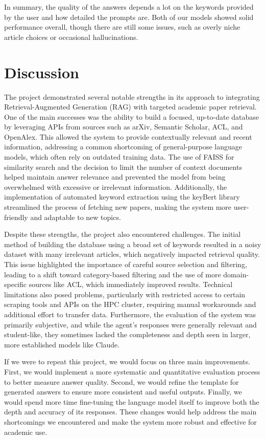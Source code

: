\documentclass[fleqn,moreauthors,10pt]{ds_report}
\begin{document}
In summary, the quality of the answers depends a lot on the keywords provided by the user and how detailed the prompts are. Both of our models showed solid performance overall, though there are still some issues, such as overly niche article choices or occasional hallucinations. 



\section*{Discussion}

The project demonstrated several notable strengths in its approach to integrating Retrieval-Augmented Generation (RAG) with targeted academic paper retrieval. One of the main successes was the ability to build a focused, up-to-date database by leveraging APIs from sources such as arXiv, Semantic Scholar, ACL, and OpenAlex. This allowed the system to provide contextually relevant and recent information, addressing a common shortcoming of general-purpose language models, which often rely on outdated training data. The use of FAISS for similarity search and the decision to limit the number of context documents helped maintain answer relevance and prevented the model from being overwhelmed with excessive or irrelevant information. Additionally, the implementation of automated keyword extraction using the keyBert library streamlined the process of fetching new papers, making the system more user-friendly and adaptable to new topics.

Despite these strengths, the project also encountered challenges. The initial method of building the database using a broad set of keywords resulted in a noisy dataset with many irrelevant articles, which negatively impacted retrieval quality. This issue highlighted the importance of careful source selection and filtering, leading to a shift toward category-based filtering and the use of more domain-specific sources like ACL, which immediately improved results. Technical limitations also posed problems, particularly with restricted access to certain scraping tools and APIs on the HPC cluster, requiring manual workarounds and additional effort to transfer data. Furthermore, the evaluation of the system was primarily subjective, and while the agent’s responses were generally relevant and student-like, they sometimes lacked the completeness and depth seen in larger, more established models like Claude.


If we were to repeat this project, we would focus on three main improvements. First, we would implement a more systematic and quantitative evaluation process to better measure answer quality. Second, we would refine the template for generated answers to ensure more consistent and useful outputs. Finally, we would spend more time fine-tuning the language model itself to improve both the depth and accuracy of its responses. These changes would help address the main shortcomings we encountered and make the system more robust and effective for academic use.
\end{document}
